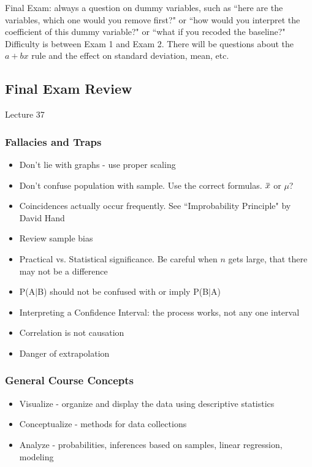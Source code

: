 \documentclass[11pt, oneside]{article}   	%
\newcommand{\overbar}[1]{\mkern 1.5mu\overline{\mkern-1.5mu#1\mkern-1.5mu}\mkern 1.5mu}
\begin{document}
Final Exam: always a question on dummy variables, such as ``here are the variables, which one would you remove first?" or ``how would you interpret the coefficient of this dummy variable?" or ``what if you recoded the baseline?" Difficulty is between Exam 1 and Exam 2. There will be questions about the $a+bx$ rule and the effect on standard deviation, mean, etc.

\subsection{Final Exam Review}
Lecture 37

\subsubsection{Fallacies and Traps}

\begin{itemize}
\item{Don't lie with graphs - use proper scaling}
\item{Don't confuse population with sample. Use the correct formulas. $\overbar{x}$ or $\mu$?}
\item{Coincidences actually occur frequently. See ``Improbability Principle" by David Hand}
\item{Review sample bias}
\item{Practical vs. Statistical significance. Be careful when $n$ gets large, that there may not be a difference}
\item{P(A$|$B) should not be confused with or imply P(B$|$A)}
\item{Interpreting a Confidence Interval: the process works, not any one interval}
\item{Correlation is not causation}
\item{Danger of extrapolation}
\end{itemize}

\subsubsection{General Course Concepts}
\begin{itemize}
\item{Visualize - organize and display the data using descriptive statistics}
\item{Conceptualize - methods for data collections}
\item{Analyze - probabilities, inferences based on samples, linear regression, modeling}
\end{itemize}
\end{document}
